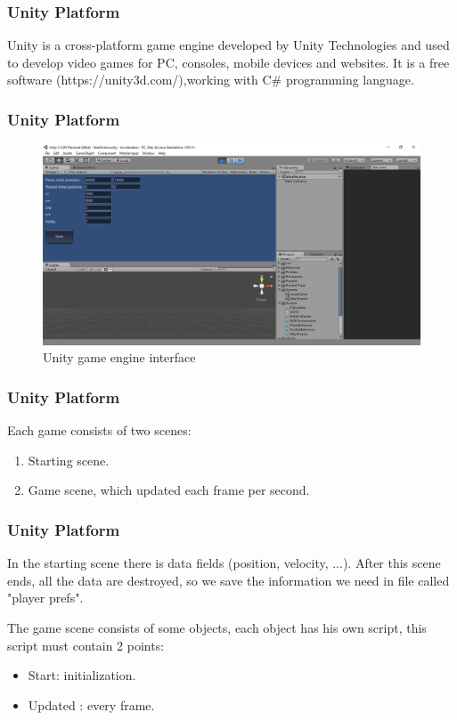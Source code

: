 \documentclass{beamer}
\begin{document}
\begin{frame}
\frametitle{Unity Platform}
Unity is a cross-platform game engine developed by Unity Technologies and used to develop video games for PC, consoles, mobile devices and websites. It is a free software (https://unity3d.com/),working with C\# programming language. 
\end{frame}
\begin{frame}
\frametitle{Unity Platform}
\begin{figure}[H]
	\centering
	\includegraphics[scale = 0.2]{fig/unityInterface.PNG}
	\caption{Unity game engine interface }
	\label{UnityInterface}
\end{figure}
\end{frame}
\begin{frame}
\frametitle{Unity Platform}
Each game consists of two scenes:
\begin{enumerate}
	\item Starting scene.
	\item Game scene, which updated each frame per second.
\end{enumerate}
\end{frame}
\begin{frame}
\frametitle{Unity Platform}
In the starting scene there is data fields (position, velocity, ...). After this scene ends, all the data are destroyed, so we save the information we need in file called "player prefs".

The game scene consists of some objects, each object has his own script, this script must contain 2 points:
\begin{itemize}
	\item Start: initialization.
	\item Updated : every frame.
\end{itemize} 
\end{frame}
\end{document}
